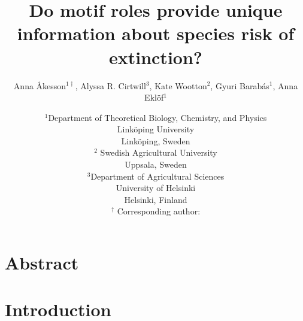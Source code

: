 \documentclass[12pt]{article}
\title{Do motif roles provide unique information about species risk of extinction?}
\author{Anna \r{A}kesson$^{1\dagger}$, Alyssa R. Cirtwill$^{3}$, Kate Wootton$^{2}$, Gyuri Barab\'{a}s$^{1}$, Anna Ekl\"{o}f$^{1}$}
\date{\small$^1$Department of Theoretical Biology, Chemistry, and Physics\\ 
Link\"{o}ping University\\
Link\"{o}ping, Sweden\\
\medskip
\small$^2$ Swedish Agricultural University\\
Uppsala, Sweden\\
\medskip
\small$^3$Department of Agricultural Sciences\\
University of Helsinki\\
Helsinki, Finland\\
\medskip
$^\dagger$ Corresponding author:\\
}
\begin{document}
 
\maketitle 
\raggedright

\setlength{\parindent}{15pt} 
\begin{spacing}{2.0}


\section*{Abstract}


    

\clearpage
\section*{Introduction}


\end{spacing}
\end{document}
